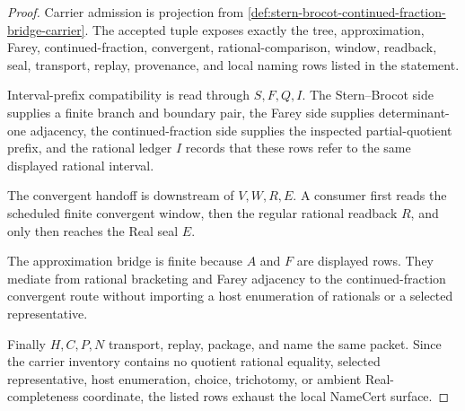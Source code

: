 \begin{proof}
Carrier admission is projection from \autoref{def:stern-brocot-continued-fraction-bridge-carrier}. The accepted tuple exposes exactly the tree, approximation, Farey, continued-fraction, convergent, rational-comparison, window, readback, seal, transport, replay, provenance, and local naming rows listed in the statement.

Interval-prefix compatibility is read through $S,F,Q,I$. The Stern--Brocot side supplies a finite branch and boundary pair, the Farey side supplies determinant-one adjacency, the continued-fraction side supplies the inspected partial-quotient prefix, and the rational ledger $I$ records that these rows refer to the same displayed rational interval.

The convergent handoff is downstream of $V,W,R,E$. A consumer first reads the scheduled finite convergent window, then the regular rational readback $R$, and only then reaches the Real seal $E$.

The approximation bridge is finite because $A$ and $F$ are displayed rows. They mediate from rational bracketing and Farey adjacency to the continued-fraction convergent route without importing a host enumeration of rationals or a selected representative.

Finally $H,C,P,N$ transport, replay, package, and name the same packet. Since the carrier inventory contains no quotient rational equality, selected representative, host enumeration, choice, trichotomy, or ambient Real-completeness coordinate, the listed rows exhaust the local NameCert surface.
\end{proof}

